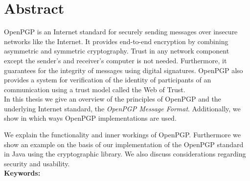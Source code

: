 

\chapter*{Abstract}
\label{cha:abstract}


{OpenPGP} is an Internet standard for securely sending messages over insecure networks like the Internet. It provides end-to-end encryption by combining asymmetric and symmetric cryptography. Trust in any network component except the sender's and receiver's computer is not needed. Furthermore, it guarantees for the integrity of messages using digital signatures. OpenPGP also provides a system for verification of the identity of participants of an communication using a trust model called the Web of Trust. \\


In this thesis we give an overview of the principles of {OpenPGP} and the underlying Internet standard, the \textit{OpenPGP Message Format}. 
Additionally, we show in which ways OpenPGP implementations are used.

We explain the functionality and inner workings of OpenPGP. Furthermore we show an example on the basis of our implementation of the OpenPGP standard in Java using the  cryptographic library.
We also discuss considerations regarding security and usability.
\\



\textbf{Keywords:} \mykeywords

